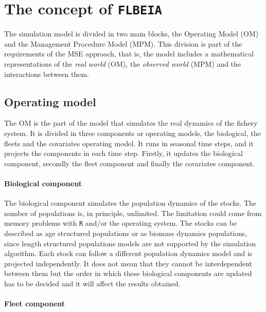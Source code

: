 
\section{The concept of \texttt{FLBEIA}} \label{sec:FLBEIAconcept}

  The simulation model is divided in two main blocks, the Operating Model (OM) and the Management Procedure Model (MPM). This division is part of 
  the requirements of the MSE approach, that is, the model includes a mathematical representations of the \textit{real world} (OM), the 
  \textit{observed world} (MPM) and the interactions between them.


\subsection{Operating model}

  The OM is the part of the model that simulates the real dynamics of the fishery system. It is divided in three components or operating models, 
  the biological, the fleets and the covariates operating model. It runs in seasonal time steps, and it projects the components in each time step. 
  Firstly, it updates the biological component, secondly the fleet component and finally the covariates component.

\paragraph{Biological component} \hspace{0pt} \smallskip

  The biological component simulates the population dynamics of the stocks. The number of populations is, in principle, unlimited. 
  The limitation could come from memory problems with \texttt{R} and/or the operating system. The stocks can be described as age structured
  populations or as biomass dynamics populations, since length structured populations models are not supported by the simulation algorithm. 
  Each stock can follow a different population dynamics model and is projected independently. It does not mean that they  cannot be interdependent 
  between them but the order in which  these biological components are updated has to be decided and it will affect the results obtained.

\paragraph{Fleet component} \hspace{0pt} \smallskip

